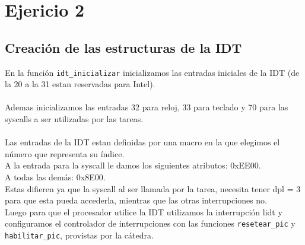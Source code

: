 \section{Ejericio 2}

\subsection{Creación de las estructuras de la IDT} 

En la función \texttt{idt\_inicializar} inicializamos las entradas iniciales de la IDT (de la 20 a la 31 estan reservadas para Intel).\\\\
Ademas inicializamos las entradas 32 para reloj, 33 para teclado y 70 para las syscalls a ser utilizadas por las tareas.\\\\
Las entradas de la IDT estan definidas por una macro en la que elegimos el número que representa su índice.\\ 
A la entrada para la syscall le damos los siguientes atributos: 0xEE00.\\
A todas las demás: 0x8E00.\\


Estas difieren ya que la syscall al ser llamada por la tarea, necesita tener dpl = 3 para que esta pueda accederla, mientras que las otras interrupciones no.\\

Luego para que el procesador utilice la IDT utilizamos la interrupción lidt y configuramos el controlador de interrupciones con las funciones \texttt{resetear\_pic} y \texttt{habilitar\_pic}, provistas por la cátedra.\\